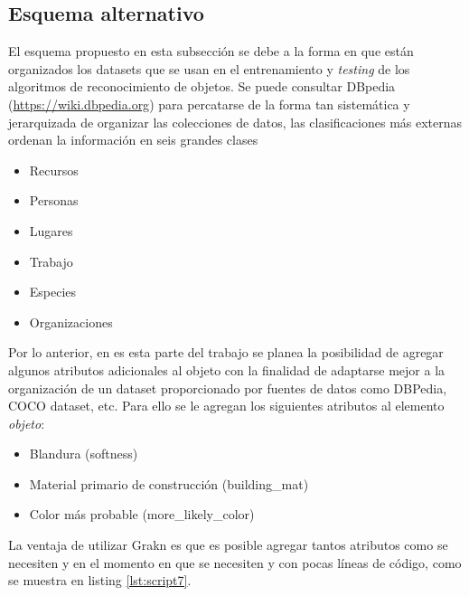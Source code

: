 \subsection{Esquema alternativo} %
\label{sub:esq-alt}
El esquema propuesto en esta subsección se debe a la forma en que están 
organizados los datasets que se usan en el entrenamiento y \textit{testing} 
de los algoritmos de reconocimiento de objetos. Se puede consultar DBpedia
(\url{https://wiki.dbpedia.org}) para percatarse de la forma tan 
sistemática y jerarquizada  de organizar las colecciones de datos, las
clasificaciones más externas ordenan la información en seis grandes clases \cite{dbpedia}

\begin{itemize}
    \item Recursos
    \item Personas
    \item Lugares
    \item Trabajo
    \item Especies
    \item Organizaciones
\end{itemize}

Por lo anterior, en es esta parte del trabajo se planea la posibilidad de agregar 
algunos atributos adicionales al objeto con la finalidad de adaptarse mejor a la 
organización de un dataset proporcionado por fuentes de datos como DBPedia, COCO 
dataset, etc. Para ello se le agregan los siguientes atributos al elemento 
\textit{objeto}:

\begin{itemize}
    \item Blandura (softness)
    \item Material primario de construcción (building\_mat)
    \item Color más probable (more\_likely\_color)
\end{itemize}

La ventaja de utilizar Grakn es que es posible agregar tantos atributos como se necesiten
y en el momento en que se necesiten y con pocas líneas de código, como se muestra en 
listing \ref{lst:script7}.




